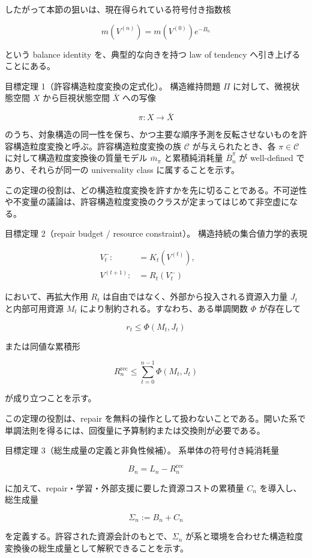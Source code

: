 \documentclass[12pt,a4paper]{article}
\begin{document}
したがって本節の狙いは、現在得られている符号付き指数核

\[
m(V^{(n)}) = m(V^{(0)}) e^{-B_{n}}
\]

という balance identity を、典型的な向きを持つ law of tendency へ引き上げることにある。

目標定理 1（許容構造粒度変換の定式化）。 構造維持問題 \(\Pi\) に対して、微視状態空間 \(X\) から巨視状態空間 \(\bar X\) への写像

\[
\pi : X \to \bar X
\]

のうち、対象構造の同一性を保ち、かつ主要な順序予測を反転させないものを許容構造粒度変換と呼ぶ。許容構造粒度変換の族 \(\mathcal C\) が与えられたとき、各 \(\pi \in \mathcal C\) に対して構造粒度変換後の質量モデル \(\bar m_\pi\) と累積純消耗量 \(\bar B_{n}^\pi\) が well-defined であり、それらが同一の universality class に属することを示す。

この定理の役割は、どの構造粒度変換を許すかを先に切ることである。不可逆性や不変量の議論は、許容構造粒度変換のクラスが定まってはじめて非空虚になる。

目標定理 2（repair budget / resource constraint）。 構造持続の集合値力学的表現

\[
\begin{aligned}
V_{t}^- :&= K_{t}(V^{(t)}), \qquad \\
V^{(t+1)} :&= R_{t}(V_{t}^-)
\end{aligned}
\]

において、再拡大作用 \(R_{t}\) は自由ではなく、外部から投入される資源入力量 \(J_{t}\) と内部可用資源 \(M_{t}\) により制約される。すなわち、ある単調関数 \(\Phi\) が存在して

\[
r_{t} \le \Phi(M_{t}, J_{t})
\]

または同値な累積形

\[
R_{n}^{\mathrm{rec}} \le \sum_{t=0}^{n-1} \Phi(M_{t}, J_{t})
\]

が成り立つことを示す。

この定理の役割は、repair を無料の操作として扱わないことである。開いた系で単調法則を得るには、回復量に予算制約または交換則が必要である。

目標定理 3（総生成量の定義と非負性候補）。 系単体の符号付き純消耗量

\[
B_{n} = L_{n} - R_{n}^{\mathrm{rec}}
\]

に加えて、repair・学習・外部支援に要した資源コストの累積量 \(C_{n}\) を導入し、総生成量

\[
\Sigma_{n} := B_{n} + C_{n}
\]

を定義する。許容された資源会計のもとで、\(\Sigma_{n}\) が系と環境を合わせた構造粒度変換後の総生成量として解釈できることを示す。
\end{document}
